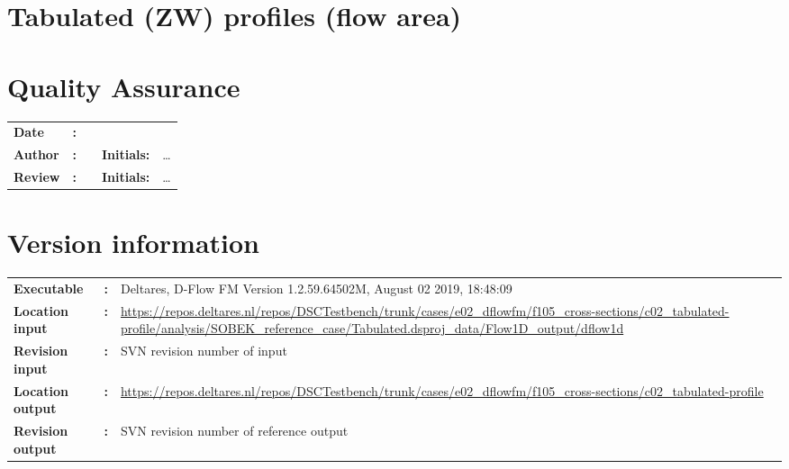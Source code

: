 

\section{Tabulated (ZW) profiles (flow area)}
\newrefsegment

\section*{Quality Assurance}
\begin{tabular}{@{}p{27mm}@{}p{0mm}p{\textwidth-52mm-48pt}p{15mm}p{10mm}}
\textbf{Date} & \textbf{:} &   \\ 
\textbf{Author} & \textbf{:} &   & \textbf{Initials:} & \ldots \\
\textbf{Review} & \textbf{:} &   & \textbf{Initials:} & \ldots 
\end{tabular}

\section*{Version information}
{{
\begin{tabular}{@{}p{27mm}@{}p{0mm}p{\textwidth-27mm-24pt}}
\textbf{Executable}   & \textbf{:} & Deltares, D-Flow FM Version 1.2.59.64502M, August 02 2019, 18:48:09  \\
\textbf{Location input}     & \textbf{:} & \url{https://repos.deltares.nl/repos/DSCTestbench/trunk/cases/e02_dflowfm/f105_cross-sections/c02_tabulated-profile/analysis/SOBEK_reference_case/Tabulated.dsproj_data/Flow1D_output/dflow1d} \\
\textbf{Revision input} & \textbf{:} & SVN revision number of input \\
\textbf{Location output}     & \textbf{:} & \url{https://repos.deltares.nl/repos/DSCTestbench/trunk/cases/e02_dflowfm/f105_cross-sections/c02_tabulated-profile} \\
\textbf{Revision output} & \textbf{:} & SVN revision number of reference output
\end{tabular}
}}

